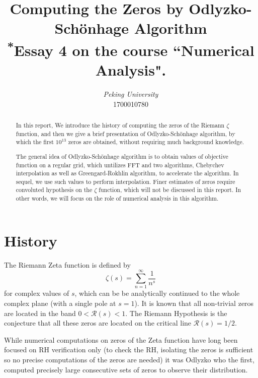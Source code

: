 \documentclass[conference,9pt]{IEEEtran}
\theoremstyle{definition}
\begin{document}
\title{{Computing the Zeros by Odlyzko-Sch{\" o}nhage Algorithm}\\
{\footnotesize \textsuperscript{*}Essay 4 on the course ``Numerical Analysis".}
}

\author{
\textit{Peking University}\\
1700010780}

\maketitle
\begin{abstract}
    In this report, We introduce the history of computing the zeros of the Riemann $\zeta$ function, and then we give a brief presentation of Odlyzko-Sch{\" o}nhage algorithm, by which the first $10^{13}$ zeros are obtained, without requiring much background knowledge.

    The general idea of Odlyzko-Sch{\" o}nhage algorithm is to obtain values of objective function on a regular grid, which untilizes FFT and two algorithms, Chebychev interpolation as well as Greengard-Rokhlin algorithm, to accelerate the algorithm. In sequel, we use such values to perform interpolation. Finer estimates of zeros require convoluted hypothesis on the $\zeta$ function, which will not be discussed in this report. In other words, we will focus on the role of numerical analysis in this algorithm.
\end{abstract}
\section{History}
The Riemann Zeta function is defined by
\begin{equation*}
    \zeta(s)=\sum_{n=1}^\infty \frac{1}{n^s}
\end{equation*}
for complex values of $s$, which can be be analytically continued to the whole complex plane (with a single pole at $s=1$). It is known that all non-trivial zeros are located in the band $0 < \mathcal{R}(s) < 1$. The Riemann Hypothesis is the conjecture that all these zeros are located on the critical line $\mathcal{R}(s)=1/2$. 

While numerical computations on zeros of the Zeta function have long been focused on RH
verification only (to check the RH, isolating the zeros is sufficient so no precise computations
of the zeros are needed) it was Odlyzko who the first, computed precisely large consecutive
sets of zeros to observe their distribution.
\end{document}
